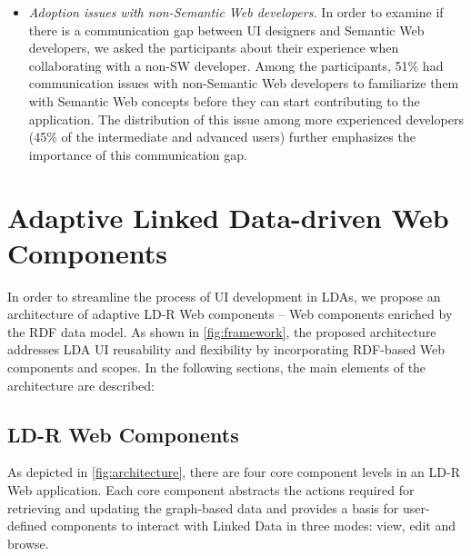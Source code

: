 \documentclass{acm_proc_article-sp}
\begin{document}
\begin{itemize}
\item
\emph{Adoption issues with non-Semantic Web developers.}
In order to examine if there is a communication gap between UI designers and Semantic Web developers, we asked the participants about their experience when collaborating with a non-SW developer.
Among the participants, 51\% had communication issues with non-Semantic Web developers to familiarize them with Semantic Web concepts before they can start contributing to the application.
The distribution of this issue among more experienced developers (45\% of the intermediate and advanced users) further emphasizes the importance of this communication gap.

\end{itemize}

\section{Adaptive Linked Data-driven Web Components}
In order to streamline the process of UI development in LDAs, we propose an architecture of adaptive LD-R Web components -- Web components enriched by the RDF data model.
As shown in \autoref{fig:framework}, the proposed architecture addresses LDA UI reusability and flexibility by incorporating RDF-based Web components and scopes.
In the following sections, the main elements of the architecture are described:

\subsection{LD-R Web Components}
As depicted in \autoref{fig:architecture}, there are four core component levels in an LD-R Web application.
Each core component abstracts the actions required for retrieving and updating the graph-based data and provides a basis for user-defined components to interact with Linked Data in three modes: view, edit and browse.
\end{document}
